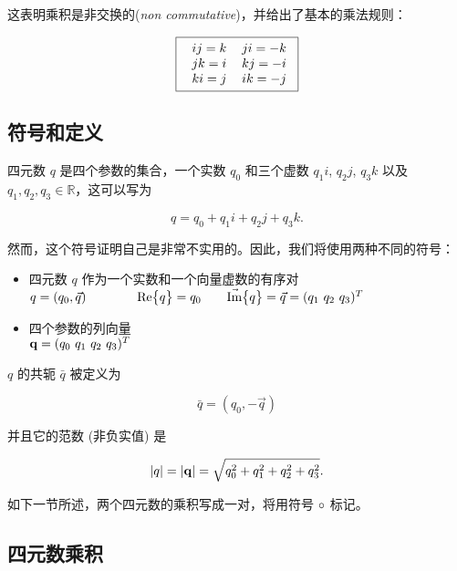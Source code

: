 这表明乘积是非交换的(\emph{non commutative})，并给出了基本的乘法规则：

\begin{equation}
\fbox{
\begin{tabular}{cc}
	$ij=k$ & $ji=-k$  \\
	$jk=i$ & $kj=-i$  \\
	$ki=j$ & $ik=-j$  \\
\end{tabular}}
\label{eq3}
\end{equation}



\subsection{符号和定义}

四元数 $q$ 是四个参数的集合，一个实数 $q_0$ 和三个虚数 $q_1i$, $q_2j$, $q_3k$ 以及 $q_1, q_2, q_3 \in  \mathbb{R}$，这可以写为
 
\begin{equation*}
q=q_0+q_1i+q_2j+q_3k .
\end{equation*}

然而，这个符号证明自己是非常不实用的。因此，我们将使用两种不同的符号：

\begin{itemize}
	\item 四元数 $q$ 作为一个实数和一个向量虚数的有序对 \\
			$q = (q_0, \vec{q})  \qquad\qquad   \RE\big\{ q \big\}=q_0  \qquad  \IM\big\{ q \big\}=\vec{q}=(q_1\ q_2\ q_3)^T$
	\item 四个参数的列向量 \\
			$\mathbf{q}=(q_0\ q_1\ q_2\ q_3)^T$
\end{itemize}

$q$ 的共轭 $\bar{q}$ 被定义为

\begin{equation*}
\bar{q} = (q_0, -\vec{q})
\end{equation*}

并且它的范数 (非负实值) 是

\begin{equation*}
|q| = |\mathbf{q}| = \sqrt{q^2_0+q^2_1+q^2_2+q^2_3}.
\end{equation*}

如下一节所述，两个四元数的乘积写成一对，将用符号 $\circ$ 标记。


\subsection{四元数乘积}

